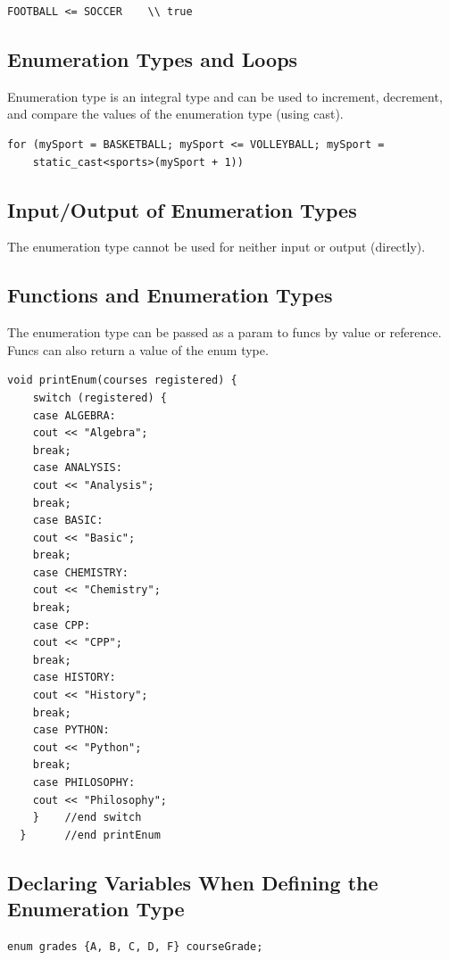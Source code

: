 \documentclass{article}
\begin{document}
\begin{lstlisting}[caption={Enumeration Type Relational Operator Example}]
  FOOTBALL <= SOCCER    \\ true
\end{lstlisting}

\subsection{Enumeration Types and Loops}
Enumeration type is an integral type and can be used to increment, decrement,
and compare the values of the enumeration type (using cast).

\begin{lstlisting}[caption={Enumeration Type Loop}]
  for (mySport = BASKETBALL; mySport <= VOLLEYBALL; mySport = 
    static_cast<sports>(mySport + 1))
\end{lstlisting}

\subsection{Input/Output of Enumeration Types}
The enumeration type cannot be used for neither input or output (directly).

\subsection{Functions and Enumeration Types}
The enumeration type can be passed as a param to funcs by value or reference.
Funcs can also return a value of the enum type.

\begin{lstlisting}[caption={\texttt{enum} Types in Functions}]
  void printEnum(courses registered) {
    switch (registered) {
    case ALGEBRA:
    cout << "Algebra";
    break;
    case ANALYSIS:
    cout << "Analysis";
    break;
    case BASIC:
    cout << "Basic";
    break;
    case CHEMISTRY:
    cout << "Chemistry";
    break;
    case CPP:
    cout << "CPP";
    break;
    case HISTORY:
    cout << "History";
    break;
    case PYTHON:
    cout << "Python";
    break;
    case PHILOSOPHY:
    cout << "Philosophy";
    }    //end switch
  }      //end printEnum
\end{lstlisting}

\subsection{Declaring Variables When Defining the Enumeration Type}
\begin{lstlisting}[caption={Simultaneous \texttt{enum} Declaration and Variable
Declaration}]
  enum grades {A, B, C, D, F} courseGrade;
\end{lstlisting}
\end{document}
